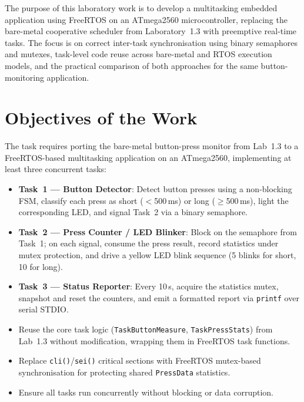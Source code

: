 \documentclass[12pt]{article}
\begin{document}
The purpose of this laboratory work is to develop a multitasking embedded application using FreeRTOS on an ATmega2560 microcontroller, replacing the bare-metal cooperative scheduler from Laboratory~1.3 with preemptive real-time tasks. The focus is on correct inter-task synchronisation using binary semaphores and mutexes, task-level code reuse across bare-metal and RTOS execution models, and the practical comparison of both approaches for the same button-monitoring application.

\section{Objectives of the Work}

The task requires porting the bare-metal button-press monitor from Lab~1.3 to a FreeRTOS-based multitasking application on an ATmega2560, implementing at least three concurrent tasks:
\begin{itemize}
  \item \textbf{Task~1 — Button Detector}: Detect button presses using a non-blocking FSM, classify each press as short (\(<\)500\,ms) or long (\(\geq\)500\,ms), light the corresponding LED, and signal Task~2 via a binary semaphore.
  \item \textbf{Task~2 — Press Counter / LED Blinker}: Block on the semaphore from Task~1; on each signal, consume the press result, record statistics under mutex protection, and drive a yellow LED blink sequence (5 blinks for short, 10 for long).
  \item \textbf{Task~3 — Status Reporter}: Every 10\,s, acquire the statistics mutex, snapshot and reset the counters, and emit a formatted report via \texttt{printf} over serial STDIO.
  \item Reuse the core task logic (\texttt{TaskButtonMeasure}, \texttt{TaskPressStats}) from Lab~1.3 without modification, wrapping them in FreeRTOS task functions.
  \item Replace \texttt{cli()}/\texttt{sei()} critical sections with FreeRTOS mutex-based synchronisation for protecting shared \texttt{PressData} statistics.
  \item Ensure all tasks run concurrently without blocking or data corruption.
\end{itemize}

\end{document}
